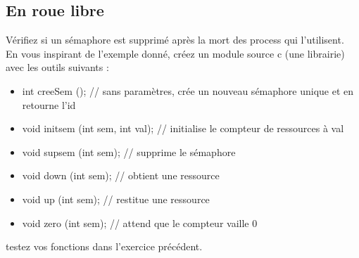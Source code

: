 \subsection{En roue libre}
Vérifiez si un sémaphore est supprimé après la mort des process qui l'utilisent. \\
\bigskip
En vous inspirant de l'exemple donné, créez un module source c (une librairie) avec les outils suivants :\\
\begin{itemize}
\item int creeSem (); // sans paramètres, crée un nouveau sémaphore unique et en retourne l'id
\item void initsem (int sem, int val); // initialise le compteur de ressources à val 
\item void supsem (int sem); // supprime le sémaphore
\item void down (int sem);   // obtient une ressource
\item void up (int sem);     // restitue une ressource
\item void zero (int sem);   // attend que le compteur vaille 0
\end{itemize}
\bigskip
testez vos fonctions dans l'exercice précédent.
\newpage
